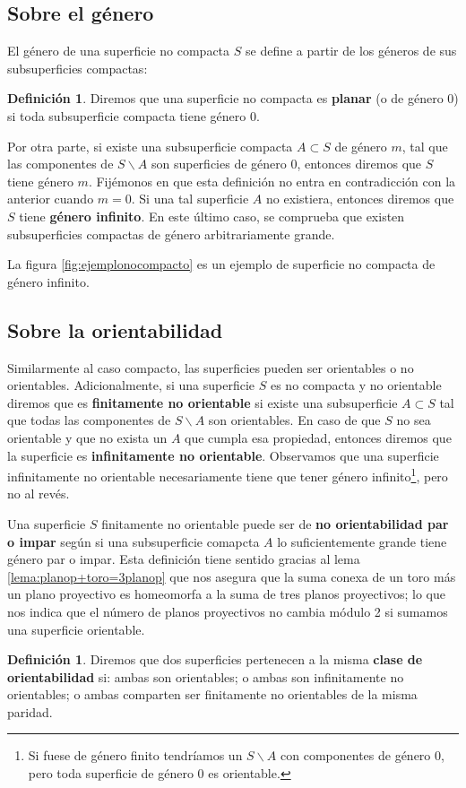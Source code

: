 \documentclass[a4paper,11pt,spanish, twoside, leqno]{tfg-uam}
\theoremstyle{definition}
\newtheorem{defin}[teor]{Definici\'on}
\begin{document}
\subsection*{Sobre el género}
El género de una superficie no compacta $S$ se define a partir de los géneros de sus subsuperficies compactas:
\begin{defin}
Diremos que una superficie no compacta es \textbf{planar} (o de género 0) si toda subsuperficie compacta tiene género 0. 
\end{defin}
Por otra parte, si existe una subsuperficie compacta $A\subset S$ de género $m$, tal que las componentes de $S\backslash A$ son superficies de género 0, entonces diremos que $S$ tiene género $m$. Fijémonos en que esta definición no entra en contradicción con la anterior cuando $m=0$. Si una tal superficie $A$ no existiera, entonces diremos que $S$ tiene \textbf{género infinito}. En este último caso, se comprueba que existen subsuperficies compactas de género arbitrariamente grande.

La figura \ref{fig:ejemplonocompacto} es un ejemplo de superficie no compacta de género infinito.

\subsection*{Sobre la orientabilidad}
Similarmente al caso compacto, las superficies pueden ser orientables o no orientables. Adicionalmente, si una superficie $S$ es no compacta y no orientable diremos que es \textbf{finitamente no orientable} si existe una subsuperficie $A\subset S$ tal que todas las componentes de $S\backslash A$ son orientables. En caso de que $S$ no sea orientable y que no exista un $A$ que cumpla esa propiedad, entonces diremos que la superficie es \textbf{infinitamente no orientable}. Observamos que una superficie infinitamente no orientable necesariamente tiene que tener género infinito\footnote{Si fuese de género finito tendríamos un $S\backslash A$ con componentes de género 0, pero toda superficie de género 0 es orientable.}, pero no al revés.

Una superficie $S$ finitamente no orientable puede ser de \textbf{no orientabilidad par o impar} según si una subsuperficie comapcta $A$ lo suficientemente grande tiene género par o impar. Esta definición tiene sentido gracias al lema \ref{lema:planop+toro=3planop} que nos asegura que la suma conexa de un toro más un plano proyectivo es homeomorfa a la suma de tres planos proyectivos; lo que nos indica que el número de planos proyectivos no cambia módulo 2 si sumamos una superficie orientable. 
\begin{defin}
Diremos que dos superficies pertenecen a la misma \textbf{clase de orientabilidad} si: ambas son orientables; o ambas son infinitamente no orientables; o ambas comparten ser finitamente no orientables de la misma paridad.
\end{defin}
\end{document}
